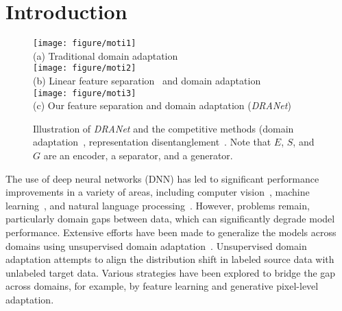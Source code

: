 \documentclass[final]{cvpr}
\begin{document}
\vspace{-3mm}
\section{Introduction}
\label{sec:intro}

\begin{figure}[t] 
	\centering
    \texttt{[image: figure/moti1]}\\
    \small{(a) Traditional domain adaptation~\cite{ganin2016domain,hoffman2018cycada}} \\
    \texttt{[image: figure/moti2]}\\
    \small{(b) Linear feature separation~\cite{zhang2018style}} and domain adaptation\\
    \texttt{[image: figure/moti3]}\\
    \small{(c) Our feature separation and domain adaptation (\textit{DRANet})}\\
    \vspace{2mm}
	\caption{Illustration of \textit{DRANet} and the competitive methods (domain adaptation~\cite{ganin2016domain,hoffman2018cycada}, representation disentanglement~\cite{zhang2018style}. Note that $E$, $S$, and $G$ are an encoder, a separator, and a generator.
	 }
	\label{fig:teaser}
	\vspace{-3mm}
\end{figure}


The use of deep neural networks (DNN) has led to significant performance improvements in a variety of areas, including computer vision~\cite{deng2009imagenet}, machine learning~\cite{goodfellow2016deep}, and natural language processing~\cite{devlin2018bert}.
However, problems remain, particularly domain gaps between data, which can significantly degrade model performance.
Extensive efforts have been made to generalize the models across domains using unsupervised domain adaptation~\cite{ben2006analysis,tzeng2014deep,long2015learning,tzeng2015simultaneous,ganin2016domain,sun2016deep,tzeng2017adversarial,liu2016coupled,bousmalis2017unsupervised,hoffman2018cycada,ye2020light}.
Unsupervised domain adaptation attempts to align the distribution shift in labeled source data with unlabeled target data.
Various strategies have been explored to bridge the gap across domains, for example, by feature learning and generative pixel-level adaptation.
\end{document}
